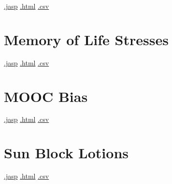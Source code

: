 \documentclass[
  letterpaper,
  DIV=11,
  numbers=noendperiod]{scrreprt}
\begin{document}
\textbar{}
\href{https://github.com/jasp-stats/jasp-data-library/raw/main/Listerism/Listerism.jasp}{.jasp}
\textbar{}
\href{https://htmlpreview.github.io/?https://github.com/jasp-stats/jasp-data-library/blob/main/Listerism/index.html}{.html}
\textbar{}
\href{https://raw.githubusercontent.com/jasp-stats/jasp-data-library/main/Listerism/Listerism.csv}{.csv}

\hypertarget{memory-of-life-stresses}{%
\section{Memory of Life Stresses}\label{memory-of-life-stresses}}

\textbar{}
\href{https://github.com/jasp-stats/jasp-data-library/raw/main/Memory\%20of\%20Life\%20Stresses/Memory\%20of\%20Life\%20Stresses.jasp}{.jasp}
\textbar{}
\href{https://htmlpreview.github.io/?https://github.com/jasp-stats/jasp-data-library/blob/main/Memory\%20of\%20Life\%20Stresses/index.html}{.html}
\textbar{}
\href{https://raw.githubusercontent.com/jasp-stats/jasp-data-library/main/Memory\%20of\%20Life\%20Stresses/Memory\%20of\%20Life\%20Stresses.csv}{.csv}

\hypertarget{mooc-bias}{%
\section{MOOC Bias}\label{mooc-bias}}

\textbar{}
\href{https://github.com/jasp-stats/jasp-data-library/raw/main/MOOC\%20Bias/MOOC\%20Bias.jasp}{.jasp}
\textbar{}
\href{https://htmlpreview.github.io/?https://github.com/jasp-stats/jasp-data-library/blob/main/MOOC\%20Bias/index.html}{.html}
\textbar{}
\href{https://raw.githubusercontent.com/jasp-stats/jasp-data-library/main/MOOC\%20Bias/MOOC\%20Bias.csv}{.csv}

\hypertarget{sun-block-lotions}{%
\section{Sun Block Lotions}\label{sun-block-lotions}}

\textbar{}
\href{https://github.com/jasp-stats/jasp-data-library/raw/main/Sun\%20Block\%20Lotions/Sun\%20Block\%20Lotions.jasp}{.jasp}
\textbar{}
\href{https://htmlpreview.github.io/?https://github.com/jasp-stats/jasp-data-library/blob/main/Sun\%20Block\%20Lotions/index.html}{.html}
\textbar{}
\href{https://raw.githubusercontent.com/jasp-stats/jasp-data-library/main/Sun\%20Block\%20Lotions/Sun\%20Block\%20Lotions.csv}{.csv}
\end{document}
